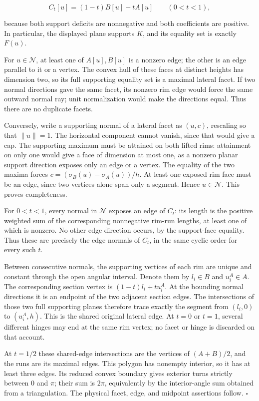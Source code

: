 \documentclass[
  11pt,
  letterpaper,
]{article}
\begin{document}
\[
C_t[u]=(1-t)B[u]+tA[u]
\qquad(0<t<1),
\]

because both support deficits are nonnegative and both coefficients are
positive. In particular, the displayed plane supports \(K\), and its
equality set is exactly \(F(u)\).

For \(u\in\mathcal N\), at least one of \(A[u],B[u]\) is a nonzero edge;
the other is an edge parallel to it or a vertex. The convex hull of
these faces at distinct heights has dimension two, so its full
supporting equality set is a maximal lateral facet. If two normal
directions gave the same facet, its nonzero rim edge would force the
same outward normal ray; unit normalization would make the directions
equal. Thus there are no duplicate facets.

Conversely, write a supporting normal of a lateral facet as \((u,c)\),
rescaling so that \(\|u\|=1\). The horizontal component cannot vanish,
since that would give a cap. The supporting maximum must be attained on
both lifted rims: attainment on only one would give a face of dimension
at most one, as a nonzero planar support direction exposes only an edge
or a vertex. The equality of the two maxima forces
\(c=(\sigma_B(u)-\sigma_A(u))/h\). At least one exposed rim face must be
an edge, since two vertices alone span only a segment. Hence
\(u\in\mathcal N\). This proves completeness.

For \(0<t<1\), every normal in \(\mathcal N\) exposes an edge of
\(C_t\): its length is the positive weighted sum of the corresponding
nonnegative rim-run lengths, at least one of which is nonzero. No other
edge direction occurs, by the support-face equality. Thus these are
precisely the edge normals of \(C_t\), in the same cyclic order for
every such \(t\).

Between consecutive normals, the supporting vertices of each rim are
unique and constant through the open angular interval. Denote them by
\(l_i\in B\) and \(u_i^A\in A\). The corresponding section vertex is
\((1-t)l_i+tu_i^A\). At the bounding normal directions it is an endpoint
of the two adjacent section edges. The intersections of those two full
supporting planes therefore trace exactly the segment from \((l_i,0)\)
to \((u_i^A,h)\). This is the shared original lateral edge. At \(t=0\)
or \(t=1\), several different hinges may end at the same rim vertex; no
facet or hinge is discarded on that account.

At \(t=1/2\) these shared-edge intersections are the vertices of
\((A+B)/2\), and the runs are its maximal edges. This polygon has
nonempty interior, so it has at least three edges. Its reduced convex
boundary gives exterior turns strictly between \(0\) and \(\pi\); their
sum is \(2\pi\), equivalently by the interior-angle sum obtained from a
triangulation. The physical facet, edge, and midpoint assertions follow.
\(\square\)
\end{document}
